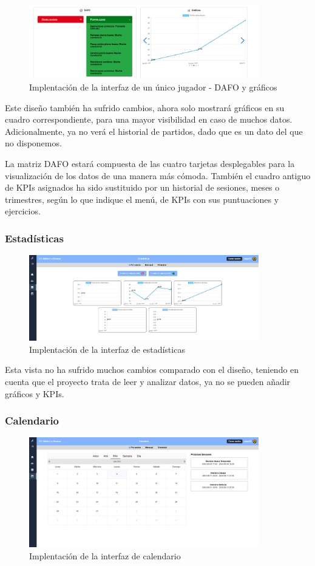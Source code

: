 \begin{figure}[H]
    \centering
    \includegraphics[width=10cm]{archivos/tfg_jorge/interfaces/jugador_2}
    \caption{Implentación de la interfaz de un único jugador - DAFO y gráficos}\label{sistemass2}
\end{figure}

Este diseño también ha sufrido cambios, ahora solo mostrará gráficos en su cuadro correspondiente, para una mayor visibilidad en caso de muchos datos. Adicionalmente, ya no verá el historial de partidos, dado que es un dato del que no disponemos.

La matriz DAFO estará compuesta de las cuatro tarjetas desplegables para la visualización de los datos de una manera más cómoda. También el cuadro antiguo de KPIs asignados ha sido sustituido por un historial de sesiones, meses o trimestres, según lo que indique el menú, de KPIs con sus puntuaciones y ejercicios.
\subsubsection{Estadísticas}
\begin{figure}[H]
    \centering
    \includegraphics[width=10cm]{archivos/tfg_jorge/interfaces/stats}
    \caption{Implentación de la interfaz de estadísticas}\label{sistemass2}
\end{figure}

Esta vista no ha sufrido muchos cambios comparado con el diseño, teniendo en cuenta que el proyecto trata de leer y analizar datos, ya no se pueden añadir gráficos y KPIs.
\subsubsection{Calendario}
\begin{figure}[H]
    \centering
    \includegraphics[width=10cm]{archivos/tfg_jorge/interfaces/calendario}
    \caption{Implentación de la interfaz de calendario}\label{sistemass2}
\end{figure}


